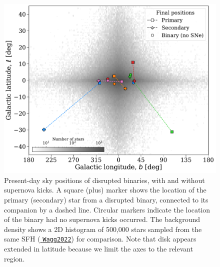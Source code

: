 \documentclass[twocolumn, twocolappendix, oneside]{aastex631}
\newcommand{\codeLink}[2]{{\href{https://cogsworth.readthedocs.io/en/latest/api/cogsworth.#2.#1.html}{\color{codecolour} \texttt{#1}}}}
\begin{document}
\begin{figure}
    \centering
    \includegraphics[width=\columnwidth]{figures/galactic_positions.pdf}
    \caption{Present-day sky positions of disrupted binaries, with and without supernova kicks. A square (plus) marker shows the location of the primary (secondary) star from a disrupted binary, connected to its companion by a dashed line. Circular markers indicate the location of the binary had no supernova kicks occurred. The background density shows a 2D histogram of 500,000 stars sampled from the same SFH (\codeLink{Wagg2022}{sfh}) for comparison. Note that disk appears extended in latitude because we limit the axes to the relevant region.}
    \label{fig:disrupted_pairs}
\end{figure}
\end{document}
